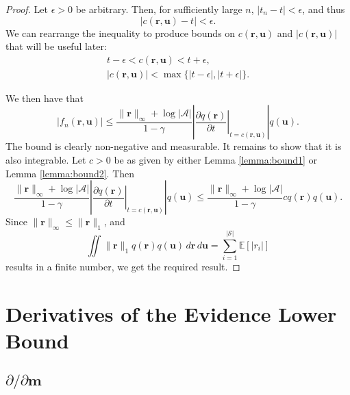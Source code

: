 \documentclass{article}
\theoremstyle{definition}
\theoremstyle{remark}
\newcommand{\fn}{f_n(\mathbf{r}, \mathbf{u})}
\newcommand{\dx}{\,d\mathbf{r}\,d\mathbf{u}}
\newcommand{\rinf}{\lVert \mathbf{r} \rVert_\infty}
\newcommand{\vbound}{\frac{\rinf + \log|\mathcal{A}|}{1 - \gamma}}
\begin{document}
\begin{proof}
  Let $\epsilon > 0$ be arbitrary. Then, for sufficiently large $n$, $|t_n - t|
  < \epsilon$, and thus
  \begin{equation} \label{eq:epsilon_bound}
    |c(\mathbf{r}, \mathbf{u}) - t| < \epsilon.
  \end{equation}
  We can rearrange the inequality to produce bounds on $c(\mathbf{r},
  \mathbf{u})$ and $|c(\mathbf{r}, \mathbf{u})|$ that will be useful later:
  \begin{align}
    t - \epsilon < c(\mathbf{r}, \mathbf{u}) < t + \epsilon, \nonumber \\
    |c(\mathbf{r}, \mathbf{u})| < \max \{ |t - \epsilon|, |t + \epsilon| \}. \label{eq:c_bound}
  \end{align}
  
  We then have that
  \[
    |\fn| \le \vbound \left| \left. \frac{\partial
          q(\mathbf{r})}{\partial t} \right|_{t=c(\mathbf{r}, \mathbf{u})}
    \right| q(\mathbf{u}).
  \]
  The bound is clearly non-negative and measurable. It remains to show that it
  is also integrable. Let $c > 0$ be as given by either Lemma \ref{lemma:bound1}
  or Lemma \ref{lemma:bound2}. Then
  \[
    \vbound \left| \left. \frac{\partial q(\mathbf{r})}{\partial t}
      \right|_{t=c(\mathbf{r}, \mathbf{u})} \right| q(\mathbf{u}) \le \vbound c
    q(\mathbf{r}) q(\mathbf{u}).
  \]
  Since $\rinf \le \lVert \mathbf{r} \rVert_1$, and
  \[
    \iint \lVert \mathbf{r} \rVert_1 q(\mathbf{r}) q(\mathbf{u})\dx =
    \sum_{i=1}^{|\mathcal{S}|} \mathbb{E}[|r_i|]
  \]
  results in a finite number, we get the required result.
\end{proof}

\section{Derivatives of the Evidence Lower Bound}

\subsection{$\partial/\partial\mathbf{m}$}
\end{document}
